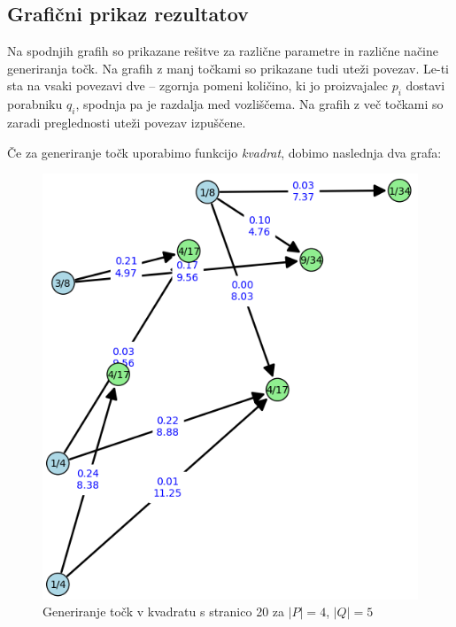 \documentclass[a4paper, 11pt]{article}
\begin{document}
\subsection{Grafični prikaz rezultatov}
Na spodnjih grafih so prikazane rešitve za različne parametre in različne načine 
generiranja točk. Na grafih z manj točkami so prikazane tudi uteži povezav.
Le-ti sta na vsaki povezavi dve -- zgornja pomeni količino, ki jo proizvajalec $p_i$ dostavi
porabniku $q_i$, spodnja pa je razdalja med vozliščema.
Na grafih z več točkami so zaradi preglednosti uteži povezav izpuščene. \par
\pagebreak
Če za generiranje točk uporabimo funkcijo \emph{kvadrat}, dobimo naslednja dva grafa:
\begin{figure}[h!]
    \centering
    \includegraphics[scale=0.56]{kvadrat.png}
    \caption{Generiranje točk v kvadratu s stranico 20 za $|P|=4$, $|Q|=5$}
\end{figure}
\end{document}
